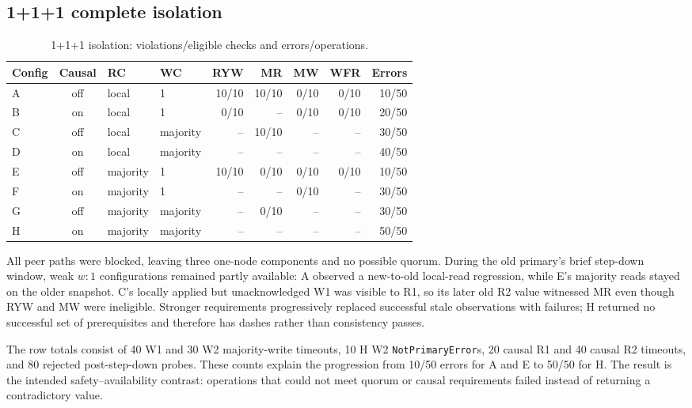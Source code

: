 \documentclass[11pt,a4paper]{article}
\begin{document}
\subsection{1+1+1 complete isolation}
\begin{table}[H]
\centering\scriptsize
\caption{1+1+1 isolation: violations/eligible checks and errors/operations.}
\begin{tabular}{@{}lcllrrrrr@{}}
\toprule Config & Causal & RC & WC & RYW & MR & MW & WFR & Errors\\ \midrule
A & off & local & 1 & 10/10 & 10/10 & 0/10 & 0/10 & 10/50\\
B & on  & local & 1 & 0/10 & -- & 0/10 & 0/10 & 20/50\\
C & off & local & majority & -- & 10/10 & -- & -- & 30/50\\
D & on  & local & majority & -- & -- & -- & -- & 40/50\\
E & off & majority & 1 & 10/10 & 0/10 & 0/10 & 0/10 & 10/50\\
F & on  & majority & 1 & -- & -- & 0/10 & -- & 30/50\\
G & off & majority & majority & -- & 0/10 & -- & -- & 30/50\\
H & on  & majority & majority & -- & -- & -- & -- & 50/50\\ \bottomrule
\end{tabular}
\end{table}

All peer paths were blocked, leaving three one-node components and no possible quorum. During
the old primary's brief step-down window, weak $w:1$ configurations remained partly
available: A observed a new-to-old local-read regression, while E's majority reads stayed on
the older snapshot. C's locally applied but unacknowledged W1 was visible to R1, so its later
old R2 value witnessed MR even though RYW and MW were ineligible. Stronger requirements
progressively replaced successful stale observations with failures; H returned no successful
set of prerequisites and therefore has dashes rather than consistency passes.

The row totals consist of 40 W1 and 30 W2 majority-write timeouts, 10 H W2
\texttt{NotPrimaryError}s, 20 causal R1 and 40 causal R2 timeouts, and 80 rejected
post-step-down probes. These counts explain the progression from 10/50 errors for A and E to
50/50 for H. The result is the intended safety--availability contrast: operations that could
not meet quorum or causal requirements failed instead of returning a contradictory value.
\FloatBarrier
\end{document}
